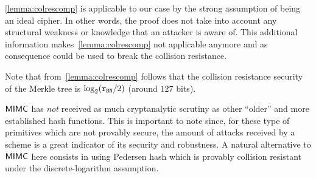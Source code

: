 \begin{notebox}
   \cref{lemma:colrescomp} is applicable to our case by the strong assumption of \mimcSevenPrime{} being an ideal cipher. In other words, the proof does not take into account any structural weakness or knowledge that an attacker is aware of. This additional information makes~\cref{lemma:colrescomp} not applicable anymore  and as consequence could be used to break the collision resistance.
\end{notebox}

\begin{remark}
    Note that from~\cref{lemma:colrescomp} follows that the collision resistance security of the \zeth{} Merkle tree is $\log_2(\mathtt{r_{BN}}/2)$ (around $127$ bits).
\end{remark}

\begin{notebox}
    $\mathsf{MIMC{}}$ has \emph{not} received as much cryptanalytic scrutiny as other ``older'' and more established hash functions. This is important to note since, for these type of primitives which are not provably secure, the amount of attacks received by a scheme is a great indicator of its security and robustness.
    A natural alternative to $\mathsf{MIMC{}}$ here consists in using Pedersen hash which is provably collision resistant under the discrete-logarithm assumption.
\end{notebox}
